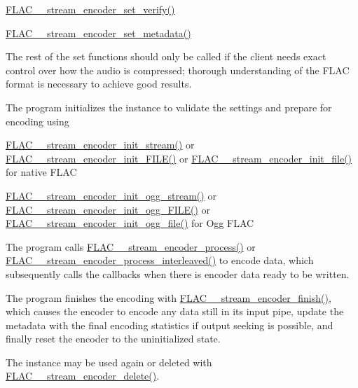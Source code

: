 \begin{DoxyItemize}
\begin{DoxyItemize}
\item \hyperlink{group__flac__stream__encoder_ga5f4ac18a7207d2864fed72d284486f9e}{F\+L\+A\+C\+\_\+\+\_\+stream\+\_\+encoder\+\_\+set\+\_\+verify()}
\item \hyperlink{group__flac__stream__encoder_ga67b30b1a67a9274f7708a22154b225f6}{F\+L\+A\+C\+\_\+\+\_\+stream\+\_\+encoder\+\_\+set\+\_\+metadata()}
\end{DoxyItemize}
\item The rest of the set functions should only be called if the client needs exact control over how the audio is compressed; thorough understanding of the F\+L\+AC format is necessary to achieve good results.
\item The program initializes the instance to validate the settings and prepare for encoding using
\begin{DoxyItemize}
\item \hyperlink{group__flac__stream__encoder_ga85221c4ceb9f22dfd4983d8f07a9a35b}{F\+L\+A\+C\+\_\+\+\_\+stream\+\_\+encoder\+\_\+init\+\_\+stream()} or \hyperlink{group__flac__stream__encoder_ga78653fea5d9bc490fff34e3ef86de944}{F\+L\+A\+C\+\_\+\+\_\+stream\+\_\+encoder\+\_\+init\+\_\+\+F\+I\+L\+E()} or \hyperlink{group__flac__stream__encoder_ga693bb5ed30d912822e0e6c7c0404428c}{F\+L\+A\+C\+\_\+\+\_\+stream\+\_\+encoder\+\_\+init\+\_\+file()} for native F\+L\+AC
\item \hyperlink{group__flac__stream__encoder_ga87af71d74c09f7d482f9f420ef9bf826}{F\+L\+A\+C\+\_\+\+\_\+stream\+\_\+encoder\+\_\+init\+\_\+ogg\+\_\+stream()} or \hyperlink{group__flac__stream__encoder_gab44c7f51a61826e04abd8cdf5c1ceac2}{F\+L\+A\+C\+\_\+\+\_\+stream\+\_\+encoder\+\_\+init\+\_\+ogg\+\_\+\+F\+I\+L\+E()} or \hyperlink{group__flac__stream__encoder_ga51eb79f04e9a676cd1ce0c94729252e4}{F\+L\+A\+C\+\_\+\+\_\+stream\+\_\+encoder\+\_\+init\+\_\+ogg\+\_\+file()} for Ogg F\+L\+AC
\end{DoxyItemize}
\item The program calls \hyperlink{group__flac__stream__encoder_gae187ec4f6cab3ca109637996ee23272d}{F\+L\+A\+C\+\_\+\+\_\+stream\+\_\+encoder\+\_\+process()} or \hyperlink{group__flac__stream__encoder_ga67c2ff5b23b945180797de420b1f27c0}{F\+L\+A\+C\+\_\+\+\_\+stream\+\_\+encoder\+\_\+process\+\_\+interleaved()} to encode data, which subsequently calls the callbacks when there is encoder data ready to be written.
\item The program finishes the encoding with \hyperlink{group__flac__stream__encoder_gab2c1e5477c1e3fe9ad0d722ff8eecda2}{F\+L\+A\+C\+\_\+\+\_\+stream\+\_\+encoder\+\_\+finish()}, which causes the encoder to encode any data still in its input pipe, update the metadata with the final encoding statistics if output seeking is possible, and finally reset the encoder to the uninitialized state.
\item The instance may be used again or deleted with \hyperlink{group__flac__stream__encoder_ga9c9956af42bebe923da59437628aa9ea}{F\+L\+A\+C\+\_\+\+\_\+stream\+\_\+encoder\+\_\+delete()}.
\end{DoxyItemize}

